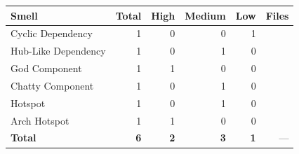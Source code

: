 \begin{tabular}{l|r|r|r|r|r}
\hline
\textbf{Smell} & \textbf{Total} & \textbf{High} & \textbf{Medium} & \textbf{Low} & \textbf{Files} \\
\hline
Cyclic Dependency & 1 & 0 & 0 & 1 \\
Hub-Like Dependency & 1 & 0 & 1 & 0 \\
God Component & 1 & 1 & 0 & 0 \\
Chatty Component & 1 & 0 & 1 & 0 \\
Hotspot & 1 & 0 & 1 & 0 \\
Arch Hotspot & 1 & 1 & 0 & 0 \\
\hline
\textbf{Total}       & \textbf{6} & \textbf{2} & \textbf{3} & \textbf{1} & --- \\
\hline
\end{tabular}